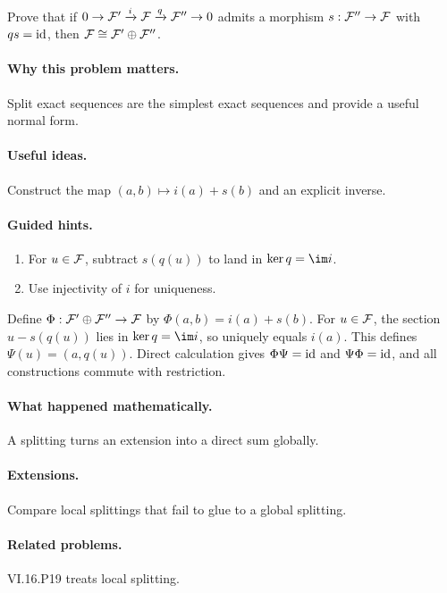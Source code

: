 \begin{problem}\label{prob:vi16-p13}
Prove that if $0\to\mathcal F'\xrightarrow{i}\mathcal F\xrightarrow{q}\mathcal F''\to0$ admits a morphism $s:\mathcal F''\to\mathcal F$ with $qs=\operatorname{id}$, then $\mathcal F\cong\mathcal F'\oplus\mathcal F''$.
\end{problem}

\ifdefined\FullProblemDossiers
\paragraph{Why this problem matters.}
Split exact sequences are the simplest exact sequences and provide a useful normal form.

\paragraph{Useful ideas.}
Construct the map $(a,b)\mapsto i(a)+s(b)$ and an explicit inverse.

\paragraph{Guided hints.}
\begin{enumerate}
\item For $u\in\mathcal F$, subtract $s(q(u))$ to land in $\ker q=\im i$.
\item Use injectivity of $i$ for uniqueness.
\end{enumerate}

\begin{solution}
Define $\Phi:\mathcal F'\oplus\mathcal F''\to\mathcal F$ by $\Phi(a,b)=i(a)+s(b)$.  For $u\in\mathcal F$, the section $u-s(q(u))$ lies in $\ker q=\im i$, so uniquely equals $i(a)$.  This defines $\Psi(u)=(a,q(u))$.  Direct calculation gives $\Phi\Psi=\operatorname{id}$ and $\Psi\Phi=\operatorname{id}$, and all constructions commute with restriction.
\end{solution}

\paragraph{What happened mathematically.}
A splitting turns an extension into a direct sum globally.

\paragraph{Extensions.}
Compare local splittings that fail to glue to a global splitting.

\paragraph{Related problems.}
VI.16.P19 treats local splitting.
\fi
